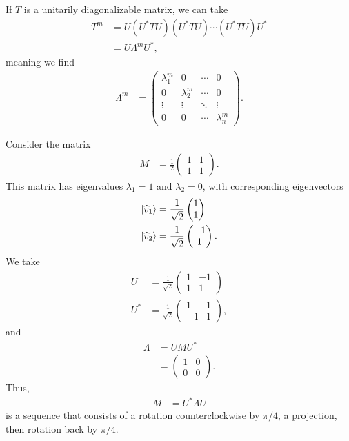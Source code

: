 \documentclass[10pt]{mypackage}
\begin{document}
\begin{example}
  \renewcommand{\arraystretch}{1.5}
If $T$ is a unitarily diagonalizable matrix, we can take
\begin{align*}
  T^{m} &= U\left(U^{\ast}TU\right)\left(U^{\ast}TU\right)\cdots \left(U^{\ast}TU\right)U^{\ast}\\
        &= U\Lambda^{m}U^{\ast},
\end{align*}
meaning we find
\begin{align*}
  \Lambda^{m} &= \begin{pmatrix}\lambda_{1}^{m} & 0 & \cdots & 0 \\ 0 & \lambda_{2}^m & \cdots & 0 \\ \vdots & \vdots & \ddots & \vdots \\ 0 & 0 & \cdots & \lambda_{n}^{m}\end{pmatrix}.
\end{align*}

\end{example}
\begin{example}
  Consider the matrix
  \begin{align*}
    M &= \frac{1}{2} \begin{pmatrix}1 & 1 \\ 1 & 1\end{pmatrix}.
  \end{align*}
  This matrix has eigenvalues $\lambda_1 = 1$ and $\lambda_2 = 0$, with corresponding eigenvectors
  \begin{align*}
    \ket{\widehat{v}_1} &= \frac{1}{\sqrt{2}} \begin{pmatrix}1\\1\end{pmatrix}\\
    \ket{\widehat{v}_2} &= \frac{1}{\sqrt{2}} \begin{pmatrix}-1\\1\end{pmatrix}.
  \end{align*}
  We take
  \begin{align*}
    U &= \frac{1}{\sqrt{2}} \begin{pmatrix}1 & -1 \\ 1 & 1\end{pmatrix}\\
    U^{\ast} &= \frac{1}{\sqrt{2}} \begin{pmatrix}1 & 1 \\ -1 & 1\end{pmatrix},
  \end{align*}
  and
  \begin{align*}
    \Lambda &= U M U^{\ast}\\
            &= \begin{pmatrix}1 & 0 \\ 0 & 0\end{pmatrix}.
  \end{align*}
  Thus,
  \begin{align*}
    M &= U^{\ast}\Lambda U
  \end{align*}
  is a sequence that consists of a rotation counterclockwise by $\pi/4$, a projection, then rotation back by $\pi/4$.
\end{example}
\end{document}

